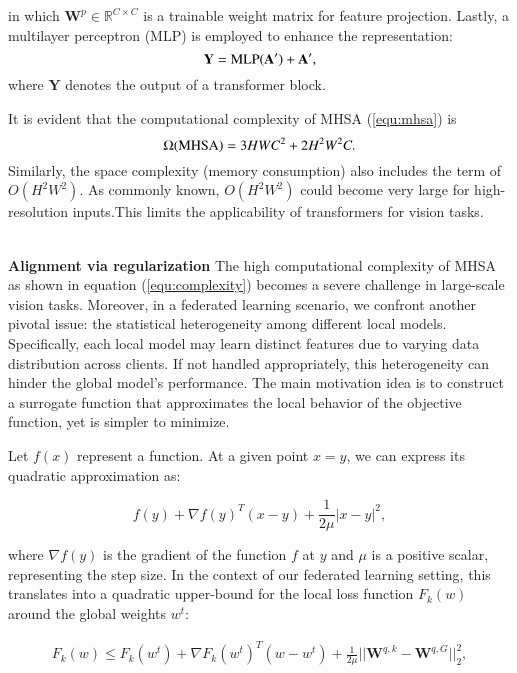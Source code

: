 in which $\mathbf{W}^p\in \mathbb{R}^{C\times C}$ is a trainable weight matrix for feature projection.
%
Lastly, a multilayer perceptron (MLP) is employed to enhance the representation:
\begin{equation}\label{equ:mlp}
\mathbf{Y} = {\rm MLP}(\mathbf{A'}) + \mathbf{A'},
\end{equation}
where $\mathbf{Y}$ denotes the output of a transformer block.

It is evident that the computational complexity of MHSA (\ref{equ:mhsa}) is
\begin{equation}\label{equ:complexity}
\Omega({\rm MHSA}) = 3HWC^2 + 2H^2 W^2 C.
\end{equation}
Similarly, the space complexity (memory consumption) also includes the term of $O(H^2 W^2)$. 
As commonly known, $O(H^2 W^2)$ could become very large for high-resolution inputs.This limits the applicability of transformers for vision tasks. 


\\\textbf{Alignment via regularization} 
The high computational complexity of MHSA as shown in equation (\ref{equ:complexity}) becomes a severe challenge in large-scale vision tasks. Moreover, in a federated learning scenario, we confront another pivotal issue: the statistical heterogeneity among different local models. Specifically, each local model may learn distinct features due to varying data distribution across clients. If not handled appropriately, this heterogeneity can hinder the global model's performance. The main motivation idea is to construct a surrogate function that approximates the local behavior of the objective function, yet is simpler to minimize.

Let $f(x)$ represent a function. At a given point $x = y$, we can express its quadratic approximation as:

\begin{equation}
f(y) + \nabla f(y)^T(x-y) + \frac{1}{2\mu}|x-y|^2 ,
\end{equation}

where $\nabla f(y)$ is the gradient of the function $f$ at $y$ and $\mu$ is a positive scalar, representing the step size. In the context of our federated learning setting, this translates into a quadratic upper-bound for the local loss function $F_k(w)$ around the global weights $w^t$:

\begin{align}\label{equ:reg}
F_k(w) \leq F_k(w^t) + \nabla F_k(w^t)^T(w-w^t) + \frac{1}{2\mu}||\mathbf{W}^{q,k}-\mathbf{W}^{q,G}||^2_2 ,
\end{align}

